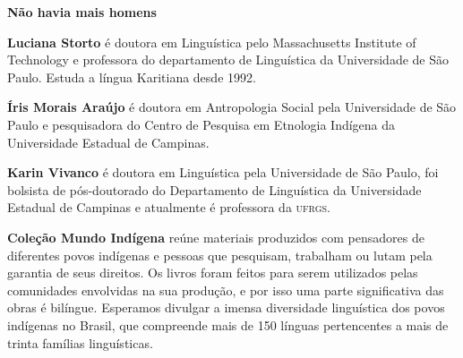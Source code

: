 \textbf{Não havia mais homens} 

\textbf{Luciana Storto} é doutora em Linguística pelo Massachusetts Institute of
Technology e professora do departamento de Linguística da Universidade
de São Paulo. Estuda a língua Karitiana desde 1992.

\textbf{Íris Morais Araújo} é doutora em Antropologia Social pela Universidade de
São Paulo e pesquisadora do Centro de Pesquisa em Etnologia Indígena da
Universidade Estadual de Campinas.

\textbf{Karin Vivanco} é doutora em Linguística pela Universidade de São Paulo,
foi bolsista de pós-doutorado do Departamento de Linguística da
Universidade Estadual de Campinas e atualmente
é professora da \textsc{ufrgs}.

\textbf{Coleção Mundo Indígena} reúne materiais produzidos com pensadores de diferentes povos indígenas e pessoas que pesquisam, trabalham ou lutam pela garantia de seus direitos. Os livros foram feitos para serem utilizados pelas comunidades envolvidas na sua produção, e por isso uma parte significativa das obras é bilíngue. Esperamos divulgar a imensa diversidade linguística dos povos indígenas no Brasil, que compreende mais de 150 línguas pertencentes a mais de trinta famílias linguísticas.


